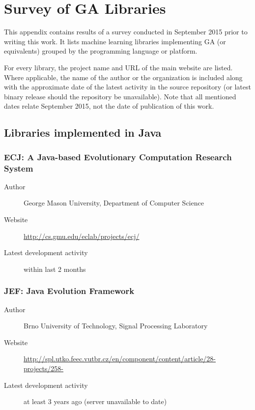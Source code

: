 \chapter{Survey of GA Libraries}

This appendix contains results of a survey conducted in September 2015 prior to writing this work. It lists machine learning libraries implementing GA (or equivalents) grouped by the programming language or platform.

For every library, the project name and URL of the main website are listed. Where applicable, the name of the author or the organization is included along with the approximate date of the latest activity in the source repository (or latest binary release should the repository be unavailable). Note that all mentioned dates relate September 2015, not the date of publication of this work.

\section{Libraries implemented in Java}

\subsection*{ECJ: A Java-based Evolutionary Computation Research System}
\begin{description}
    \item[Author] George Mason University, Department of Computer Science
    \item[Website] \url{http://cs.gmu.edu/eclab/projects/ecj/}
    \item[Latest development activity] within last 2 months
\end{description}


\subsection*{JEF: Java Evolution Framework}
\begin{description}
    \item[Author] Brno University of Technology, Signal Processing Laboratory
    \item[Website] \url{http://spl.utko.feec.vutbr.cz/en/component/content/article/28-projects/258-}
    \item[Latest development activity] at least 3 years ago (server unavailable to date)
\end{description}


